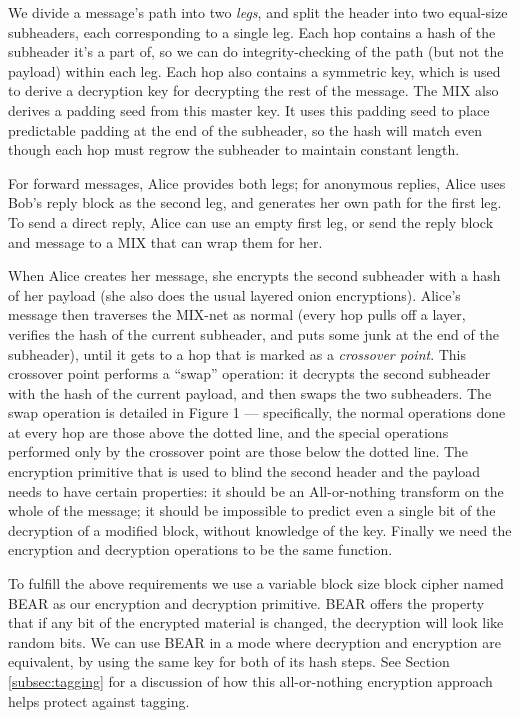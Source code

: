\documentclass{llncs}
\begin{document}

We divide a message's path into two \emph{legs}, and split the header
into two equal-size subheaders, each corresponding to a single leg.
Each hop contains a hash of the subheader it's a part of, so we can do
integrity-checking of the path (but not the payload) within each leg.
Each hop also contains a symmetric key, which is used to derive a
decryption key for decrypting the rest of the message. The MIX also
derives a padding seed from this master key. It uses this padding seed
to place
predictable padding at the end of the subheader, so the hash will
match even though each hop must regrow the subheader to maintain
constant length.

For forward messages, Alice provides both legs; for anonymous replies, Alice
uses Bob's reply block as the second leg, and generates her own path
for the first leg.  To send a direct reply, Alice can use an empty
first leg, or send the reply block and message to a MIX that can wrap
them for her.

When Alice creates her message, she encrypts the second subheader
with a hash of her payload (she also does the usual layered onion
encryptions). Alice's message then traverses the MIX-net as normal (every
hop pulls off a layer, verifies the hash of the current subheader,
and puts some junk at the end of the subheader), until it gets to a
hop that is marked as a \emph{crossover point}. This crossover point
performs a ``swap'' operation: it decrypts the second subheader with
the hash of the current payload, and then swaps the two subheaders. The
swap operation is detailed in Figure 1 --- specifically, the normal
operations done at every hop are those above the dotted line, and the
special operations performed only by the crossover point are those below
the dotted line. The encryption primitive that is used to blind the second 
header and the payload needs to have certain properties: it should be an 
All-or-nothing transform on the whole of the message; it should be impossible 
to predict even a single bit of the decryption of a modified block, without 
knowledge of the key. Finally we need the encryption and decryption 
operations to be the same function.

To fulfill the above requirements we use a variable block size 
block cipher named BEAR
\cite{BEAR} as our encryption and decryption primitive.  BEAR offers
the property that if any bit of the encrypted material is changed, the
decryption will look like random bits. We can use BEAR in a mode where
decryption and encryption are equivalent, by using the same key for
both of its hash steps. See Section \ref{subsec:tagging} for a discussion of
how this all-or-nothing encryption approach helps protect against tagging.
\end{document}
